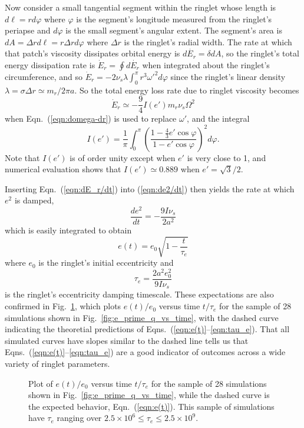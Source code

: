 \documentclass[preprint]{aastex62}
\begin{document}
Now consider a small tangential segment within the ringlet whose length is $d\ell=rd\varphi$ where 
$\varphi$ is the segment's longitude measured from the ringlet's periapse and
$d\varphi$ is the small segment's angular extent. The segment's area is 
$dA=\Delta rd\ell=r\Delta r d\varphi$
where $\Delta r$ is the ringlet's radial width.
The rate at which that patch's viscosity dissipates orbital energy is $d\dot{E_r}=\delta dA$, so
the ringlet's total energy dissipation rate is 
$\dot{E}_r = \oint d\dot{E_r}$ when integrated about the ringlet's circumference, and so
$\dot{E}_r = -2\nu_s\lambda\int_0^\pi r^3\omega'^2d\varphi$
since the ringlet's linear density $\lambda=\sigma\Delta r\simeq m_r/2\pi a$. So the
total energy loss rate due to ringlet viscosity becomes
\begin{equation}
    \label{eqn:dE_r/dt}
    \dot{E}_r \simeq -\frac{9}{4}I(e')m_r\nu_s\Omega^2
\end{equation}
when Eqn.\ (\ref{eqn:domega-dr}) is used to replace $\omega'$, and the integral 
\begin{equation}
    I(e') =  \frac{1}{\pi}\int_0^\pi\left(\frac{1-\frac{4}{3}e'\cos\varphi}{1-e'\cos\varphi}\right)^2d\varphi .
\end{equation}
Note that  $I(e')$ is of order
unity except when $e'$ is very close to 1, and numerical evaluation shows that $I(e')\simeq0.889$
when $e'=\sqrt{3}/2$.

Inserting Eqn.\ (\ref{eqn:dE_r/dt}) into (\ref{eqn:de2/dt}) then yields the rate at which $e^2$
is damped,
\begin{equation}
    \label{eqn:de2/dt_v2}
    \frac{de^2}{dt} = -\frac{9I\nu_s}{2a^2}
\end{equation}
which is easily integrated to obtain
\begin{equation}
    \label{eqn:e(t)}
    e(t) = e_0\sqrt{1-\frac{t}{\tau_e}}
\end{equation}
where $e_0$ is the ringlet's initial eccentricity and
\begin{equation}
    \label{eqn:tau_e}
    \tau_e = \frac{2a^2e_0^2}{9I\nu_s}
\end{equation}
is the ringlet's eccentricity damping timescale.
These expectations are also confirmed in Fig.\ \ref{fig:e_vs_tau_e}, which plots
$e(t)/e_0$ versus time $t/\tau_e$ for the sample of 28 simulations 
shown in Fig.\ \ref{fig:e_prime_q_vs_time}, with the dashed curve
indicating the theoretial predictions of Eqns.\ (\ref{eqn:e(t)}--\ref{eqn:tau_e}).
That all simulated curves have slopes similar to the dashed line tells us that
Eqns.\ (\ref{eqn:e(t)}--\ref{eqn:tau_e}) are a good indicator of outcomes across
a wide variety of ringlet parameters.
\begin{figure}
    \caption{
        \label{fig:e_vs_tau_e}
        Plot of $e(t)/e_0$ versus time $t/\tau_e$ for the sample of 28
        simulations shown in Fig.\ \ref{fig:e_prime_q_vs_time},
        while the dashed curve is the expected behavior, Eqn.\ (\ref{eqn:e(t)}).
        This sample of simulations have $\tau_e$ ranging over 
        $2.5\times10^6 \le \tau_e \le 2.5\times10^9$.
    }
\end{figure}
\end{document}
